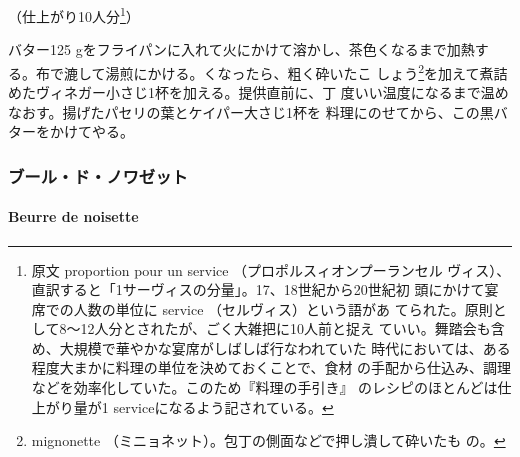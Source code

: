 \begin{recette}

（仕上がり10人分\footnote{原文 proportion pour un service
  （プロポルスィオンプーランセル
  ヴィス）、直訳すると「1サーヴィスの分量」。17、18世紀から20世紀初
  頭にかけて宴席での人数の単位に service （セルヴィス）という語があ
  てられた。原則として8〜12人分とされたが、ごく大雑把に10人前と捉え
  ていい。舞踏会も含め、大規模で華やかな宴席がしばしば行なわれていた
  時代においては、ある程度大まかに料理の単位を決めておくことで、食材
  の手配から仕込み、調理などを効率化していた。このため『料理の手引き』
  のレシピのほとんどは仕上がり量が1 serviceになるよう記されている。}）

バター125 gをフライパンに入れて火にかけて溶かし、茶色くなるまで加熱す
る。布で漉して湯煎にかける。くなったら、粗く砕いたこ
しょう\footnote{mignonette
  （ミニョネット）。包丁の側面などで押し潰して砕いたも の。}を加えて煮詰めたヴィネガー小さじ1杯を加える。提供直前に、丁
度いい温度になるまで温めなおす。揚げたパセリの葉とケイパー大さじ1杯を
料理にのせてから、この黒バターをかけてやる。

\maeaki

\hypertarget{ux30d6ux30fcux30ebux30c9ux30ceux30efux30bcux30c3ux30c8}{%
\subsubsection{ブール・ド・ノワゼット}\label{ux30d6ux30fcux30ebux30c9ux30ceux30efux30bcux30c3ux30c8}}

\hypertarget{beurre-de-noisette}{%
\paragraph{Beurre de noisette}\label{beurre-de-noisette}}



\end{recette}
